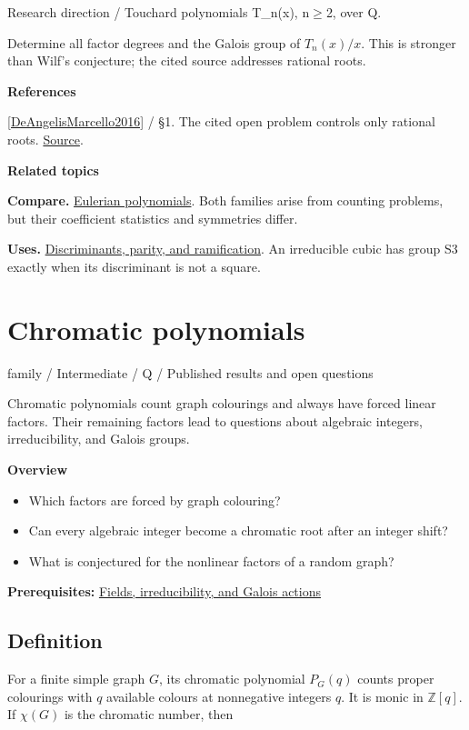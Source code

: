 \documentclass[11pt,a4paper,oneside,openany]{book}
\newenvironment{sources}{\par\smallskip\begingroup\footnotesize\color{atlasgray}\leftskip=10pt\setlength{\parskip}{2pt}}{\par\endgroup\smallskip}
\begin{document}
{\small\sffamily\color{atlasgold}Research direction / Touchard polynomials T\_\allowbreak{}n(x), n\ensuremath{\ge}2, over Q.}\par\smallskip
\color{black} Determine all factor degrees and the Galois group of \(T_n(x)/x\). This is stronger than Wilf's conjecture; the cited source addresses rational roots.\par
\begin{sources}
\textbf{References}\par\smallskip
\noindent\hyperlink{ref:DeAngelisMarcello2016}{[DeAngelisMarcello2016]} / §1. The cited open problem controls only rational roots. \href{https://doi.org/10.4169/amer.math.monthly.123.6.557}{Source}.\par
\end{sources}\color{black}
\par\medskip\begingroup\footnotesize\setlength{\parskip}{1pt}\textbf{\sffamily\color{atlasgreen}Related topics}\par
\color{black}\textbf{Compare.} \hyperlink{article:eulerian}{Eulerian polynomials}. Both families arise from counting problems, but their coefficient statistics and symmetries differ.\par
\color{black}\textbf{Uses.} \hyperlink{article:discriminants}{Discriminants, parity, and ramification}. An irreducible cubic has group S3 exactly when its discriminant is not a square.\par
\endgroup
\chapter{Chromatic polynomials}\label{article:chromatic-polynomials}\hypertarget{article:chromatic-polynomials}{}\color{black}
{\sffamily\small\color{atlasgold}family / Intermediate / Q / Published results and open questions}\par\medskip
Chromatic polynomials count graph colourings and always have forced linear factors. Their remaining factors lead to questions about algebraic integers, irreducibility, and Galois groups.\par\medskip
\textbf{Overview}\begin{itemize}
\item Which factors are forced by graph colouring?
\item Can every algebraic integer become a chromatic root after an integer shift?
\item What is conjectured for the nonlinear factors of a random graph?
\end{itemize}
{\small\textbf{Prerequisites:} \hyperlink{article:foundations}{Fields, irreducibility, and Galois actions}}\par
{}\section{Definition}
\color{black} For a finite simple graph \(G\), its chromatic polynomial \(P_G(q)\) counts proper colourings with \(q\) available colours at nonnegative integers \(q\). It is monic in \(\mathbb Z[q]\). If \(\chi(G)\) is the chromatic number, then\par
\end{document}
